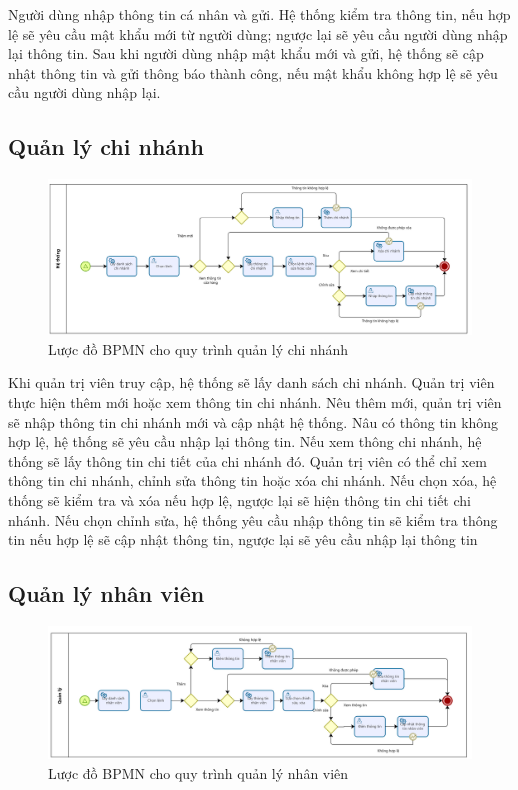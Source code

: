 Người dùng nhập thông tin cá nhân và gửi. Hệ thống kiểm tra thông tin, nếu hợp lệ sẽ yêu cầu mật khẩu mới từ người dùng; ngược lại sẽ yêu cầu người dùng nhập lại thông tin. Sau khi người dùng nhập mật khẩu mới và gửi, hệ thống sẽ cập nhật thông tin và gửi thông báo thành công, nếu mật khẩu không hợp lệ sẽ yêu cầu người dùng nhập lại.


\subsection{Quản lý chi nhánh}
\begin{figure}[!htp]
	\centering
	\includegraphics[width=14cm]{img/BPMN/Hien/Branch_management.png}
	\newline
	\caption{Lược đồ BPMN cho quy trình quản lý chi nhánh}
\end{figure}

Khi quản trị viên truy cập, hệ thống sẽ lấy danh sách chi nhánh. Quản trị viên thực hiện thêm mới hoặc xem thông tin chi nhánh. Nêu thêm mới, quản trị viên sẽ nhập thông tin chi nhánh mới và cập nhật hệ thống. Nâu có thông tin không hợp lệ, hệ thống sẽ yêu cầu nhập lại thông tin. Nếu xem thông chi nhánh, hệ thống sẽ lấy thông tin chi tiết của chi nhánh đó. Quản trị viên có thể chỉ xem thông tin chi nhánh, chỉnh sửa thông tin hoặc xóa chi nhánh. Nếu chọn xóa, hệ thống sẽ kiểm tra và xóa nếu hợp lệ, ngược lại sẽ hiện thông tin chi tiết chi nhánh. Nếu chọn chỉnh sửa, hệ thống yêu cầu nhập thông tin sẽ kiểm tra thông tin nếu hợp lệ sẽ cập nhật thông tin, ngược lại sẽ yêu cầu nhập lại thông tin


\subsection{Quản lý nhân viên}
\begin{figure}[!htp]
	\centering
	\includegraphics[width=14cm]{img/BPMN/Hien/Employee_Management.png}
	\newline
	\caption{Lược đồ BPMN cho quy trình quản lý nhân viên}
\end{figure}

